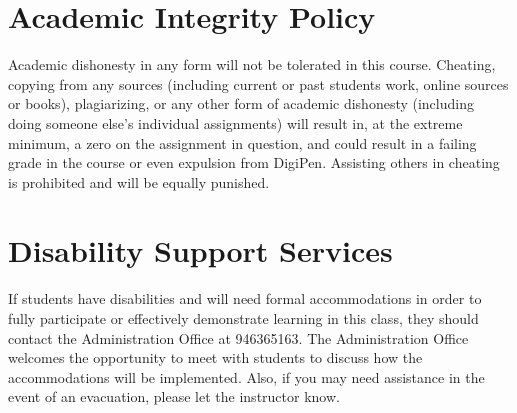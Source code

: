 \documentclass[12pt]{article}
\begin{document}
\section*{Academic Integrity Policy}

Academic dishonesty in any form will not be tolerated in this course. Cheating, copying from any sources (including current or past students work, online sources 
or books), plagiarizing, or any other form of academic dishonesty (including doing someone else’s individual assignments) will result in, at the extreme minimum,
 a zero on the assignment in question, and could result in a failing grade in the course or even expulsion from DigiPen. Assisting others in cheating is prohibited 
 and will be equally punished.

\section*{Disability Support Services}

If students have disabilities and will need formal accommodations in order to fully participate or effectively demonstrate learning in this class, they should 
contact the Administration Office at 946365163. The Administration Office welcomes the opportunity to meet with students to discuss how the accommodations will
 be implemented. Also, if you may need assistance in the event of an evacuation, please let the instructor know. 








\end{document}
